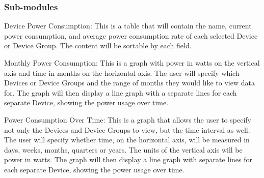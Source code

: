 \subsubsection{Sub-modules}
Device Power Consumption:
This is a table that will contain the name, current power consumption, and average power consumption rate of each selected Device or Device Group. 
The content will be sortable by each field.

Monthly Power Consumption:
This is a graph with power in watts on the vertical axis and time in months on the horizontal axis. 
The user will specify which Devices or Device Groups and the range of months they would like to view data for. 
The graph will then display a line graph with a separate lines for each separate Device, showing the power usage over time. 

Power Consumption Over Time:
This is a graph that allows the user to specify not only the Devices and Device Groups to view, but the time interval as well. 
The user will specify whether time, on the horizontal axis, will be measured in days, weeks, months, quarters or years. 
The units of the vertical axis will be power in watts. 
The graph will then display a line graph with separate lines for each separate Device, showing the power usage over time. 